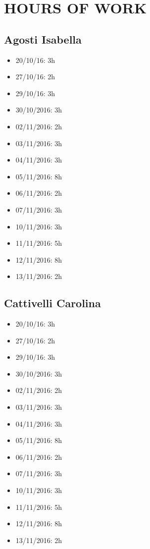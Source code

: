 \section{HOURS OF WORK}
\subsection{Agosti Isabella}
\begin{itemize}
	\item 20/10/16: 3h
	\item 27/10/16: 2h 
	\item 29/10/16: 3h
	\item 30/10/2016: 3h
	\item 02/11/2016: 2h
	\item 03/11/2016: 3h
	\item 04/11/2016: 3h
	\item 05/11/2016: 8h
	\item 06/11/2016: 2h
	\item 07/11/2016: 3h
	\item 10/11/2016: 3h
	\item 11/11/2016: 5h
	\item 12/11/2016: 8h
	\item 13/11/2016: 2h
\end{itemize}
\newpage
\subsection{Cattivelli Carolina}
\begin{itemize}
	\item 20/10/16: 3h
	\item 27/10/16: 2h
	\item 29/10/16: 3h
	\item 30/10/2016: 3h
	\item 02/11/2016: 2h
	\item 03/11/2016: 3h
	\item 04/11/2016: 3h
	\item 05/11/2016: 8h
	\item 06/11/2016: 2h
	\item 07/11/2016: 3h
	\item 10/11/2016: 3h
	\item 11/11/2016: 5h
	\item 12/11/2016: 8h
	\item 13/11/2016: 2h
\end{itemize}